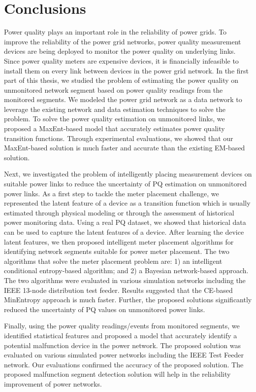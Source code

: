 \label{chap:conclusion}
\section{Conclusions}
Power quality plays an important role in the reliability of power grids. To improve the reliability of the power grid networks, power quality measurement devices are being deployed to monitor the power quality on underlying links. Since power quality meters are expensive devices, it is financially infeasible to install them on every link between devices in the power grid network. In the first part of this thesis, we studied the problem of estimating the power quality on unmonitored network segment based on power quality readings from the monitored segments. We modeled the power grid network as a data network to leverage the existing network and data estimation techniques to solve the problem. To solve the power quality estimation on unmonitored links,  we proposed a MaxEnt-based model that accurately estimates power quality transition functions. Through experimental evaluations, we showed that our MaxEnt-based solution is much faster and accurate than the existing EM-based solution.

Next, we investigated the problem of intelligently placing measurement devices on suitable power links to reduce the uncertainty of PQ estimation on unmonitored power links. As a first step to tackle the meter placement challenge, we represented the latent feature of a device as a transition function which is usually estimated through physical modeling or through the assessment of historical power monitoring data. Using a real PQ dataset, we showed that historical data can be used to capture the latent features of a device. After learning the device latent features, we then proposed intelligent meter placement algorithms for identifying network segments suitable for power meter placement. The two algorithms that solve the meter placement problem are: 1)  an intelligent conditional entropy-based algorithm; and 2) a Bayesian network-based approach. The two algorithms were evaluated in various simulation networks including the IEEE 13-node distribution test feeder. Results suggested that the CE-based MinEntropy approach is much faster. Further, the proposed solutions significantly reduced the uncertainty of PQ values on unmonitored power links.

Finally, using the power quality readings/events from monitored segments, we identified statistical features and proposed a model that accurately identify a potential malfunction device in the power network. The proposed solution was evaluated on various simulated power networks including the IEEE Test Feeder network. Our evaluations confirmed the accuracy of the proposed solution. The proposed malfunction segment detection solution will help in the reliability improvement of power networks.


